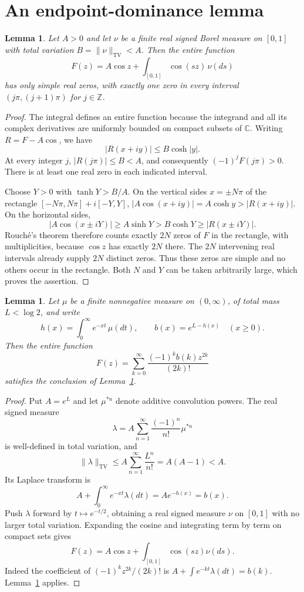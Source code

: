 \documentclass[11pt,a4paper]{article}
\newtheorem{lemma}[theorem]{Lemma}
\begin{document}
\section{An endpoint-dominance lemma}
\begin{lemma}\label{lem:rouche}
Let $A>0$ and let $\nu$ be a finite real signed Borel measure on $[0,1]$
with total variation $B=\|\nu\|_{\mathrm{TV}}<A$. Then the entire function
\[
F(z)=A\cos z+\int_{[0,1]}\cos(sz)\,\nu(ds)
\]
has only simple real zeros, with exactly one zero in every interval
$(j\pi,(j+1)\pi)$ for $j\in\mathbb Z$.
\end{lemma}
\begin{proof}
The integral defines an entire function because the integrand and all its
complex derivatives are uniformly bounded on compact subsets of $\mathbb C$.
Writing $R=F-A\cos$, we have
\[
|R(x+iy)|\le B\cosh|y|.
\]
At every integer $j$, $|R(j\pi)|\le B<A$, and consequently
$(-1)^jF(j\pi)>0$. There is at least one real zero in each indicated interval.

Choose $Y>0$ with $\tanh Y>B/A$. On the vertical sides $x=\pm N\pi$
of the rectangle $[-N\pi,N\pi]+i[-Y,Y]$,
$|A\cos(x+iy)|=A\cosh y>|R(x+iy)|$. On the horizontal sides,
\[
|A\cos(x\pm iY)|\ge A\sinh Y>B\cosh Y\ge|R(x\pm iY)|.
\]
Rouch\'e's theorem therefore counts exactly $2N$ zeros of $F$ in the
rectangle, with multiplicities, because $\cos z$ has exactly $2N$ there.
The $2N$ intervening real intervals already supply $2N$ distinct zeros.
Thus these zeros are simple and no others occur in the rectangle.
Both $N$ and $Y$ can be taken arbitrarily large, which proves the assertion.
\end{proof}

\begin{lemma}\label{lem:laplace}
Let $\mu$ be a finite nonnegative measure on $(0,\infty)$, of total mass
$L<\log2$, and write
\[
h(x)=\int_0^\infty e^{-xt}\,\mu(dt),\qquad
b(x)=e^{L-h(x)}\quad(x\ge0).
\]
Then the entire function
\[
F(z)=\sum_{k=0}^{\infty}\frac{(-1)^k b(k)z^{2k}}{(2k)!}
\]
satisfies the conclusion of Lemma~\ref{lem:rouche}.
\end{lemma}
\begin{proof}
Put $A=e^L$ and let $\mu^{*n}$ denote additive convolution powers. The real
signed measure
\[
\lambda=A\sum_{n=1}^{\infty}\frac{(-1)^n}{n!}\mu^{*n}
\]
is well-defined in total variation, and
\[
\|\lambda\|_{\mathrm{TV}}
\le A\sum_{n=1}^{\infty}\frac{L^n}{n!}
=A(A-1)<A.
\]
Its Laplace transform is
\[
A+\int_0^\infty e^{-xt}\lambda(dt)
=Ae^{-h(x)}=b(x).
\]
Push $\lambda$ forward by $t\mapsto e^{-t/2}$, obtaining a real signed
measure $\nu$ on $[0,1]$ with no larger total variation. Expanding the
cosine and integrating term by term on compact sets gives
\[
F(z)=A\cos z+\int_{[0,1]}\cos(sz)\nu(ds).
\]
Indeed the coefficient of $(-1)^kz^{2k}/(2k)!$ is
$A+\int e^{-kt}\lambda(dt)=b(k)$. Lemma~\ref{lem:rouche} applies.
\end{proof}
\end{document}
